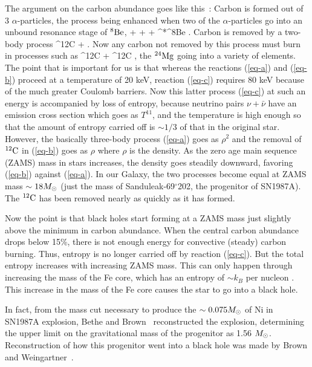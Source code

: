 \documentclass[aps,twocolumn,preprintnumbers,%
superscriptaddress,floatfix]{revtex4}
\begin{document}
The argument on the carbon abundance goes like this~\cite{Bro01}: Carbon is formed out of 3 $\alpha$-particles, the process being enhanced when two of the $\alpha$-particles go into an unbound resonance stage of ${^8}{\rm Be}$,
\be
\alpha + \alpha + \alpha\longrightarrow \alpha + {^*}{^8}{\rm Be} .
\label{eq-a}\ee
Carbon is removed by a two-body process
\be
{^{12}}{\rm C} + \alpha {}.
\label{eq-b}\ee
Now any carbon not removed by this process must burn in processes such as
\be
{^{12}}{\rm C} + {^{12}}{\rm C} ,
\label{eq-c}\ee
the ${^{24}}{\rm Mg}$ going into a variety of elements. The point that is important for us is that whereas the reactions (\ref{eq-a}) and (\ref{eq-b}) proceed at a temperature of 20 keV, reaction (\ref{eq-c}) requires 80 keV because of the much greater Coulomb barriers. Now this latter process (\ref{eq-c}) at such an energy is accompanied by loss of entropy, because neutrino pairs $\nu +\bar\nu$ have an emission cross section which goes as $T^{11}$, and the temperature is high enough so that the amount of entropy carried off is $\sim 1/3$ of that in the original star.
However, the basically three-body process (\ref{eq-a}) goes as $\rho^2$ and the removal of ${^{12}}{\rm C}$ in (\ref{eq-b}) goes as $\rho$ where $\rho$ is the density. As the zero age main sequence (ZAMS) mass in stars increases, the density goes steadily downward, favoring (\ref{eq-b}) against (\ref{eq-a}). In our Galaxy, the two processes become equal at ZAMS mass $\sim 18\mbox{$M_\odot$}$ (just the mass of Sanduleak-69$^\circ$202, the progenitor of SN1987A). The ${^{12}}{\rm C}$ has been removed nearly as quickly as it has formed.


Now the point is that black holes  start forming at a ZAMS mass just slightly above the minimum in carbon abundance. When the central carbon abundance drops below 15\%, there is not enough energy for convective (steady) carbon burning. Thus, entropy is no longer carried off by reaction (\ref{eq-c}). But the total entropy increases with increasing ZAMS mass. This can only happen through increasing the mass of the Fe core, which has an entropy of $\sim k_B$ per nucleon \cite{Bet79}. This increase in the mass of the Fe core causes the star to go into a black hole.

In fact, from the mass cut necessary to produce the $\sim 0.075\mbox{$M_\odot$}$ of Ni in SN1987A explosion, Bethe and Brown~\cite{BBSN87} reconstructed the explosion, determining the upper limit on the gravitational mass of the progenitor as 1.56 $\mbox{$M_\odot$}$. Reconstruction of how this progenitor went into a black hole was made by Brown and Weingartner~\cite{brown-wein}.
\end{document}
